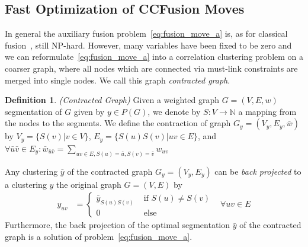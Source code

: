 \documentclass[10pt,twocolumn,letterpaper]{article}
\theoremstyle{definition}
\newtheorem{definition}{Definition}
\begin{document}
\subsection{Fast Optimization of CCFusion Moves} \label{sec:fast_optimization}
In general the auxiliary fusion problem~\ref{eq:fusion_move_a} is, as for classical fusion~\cite{Lempitsky-2010}, still NP-hard.
However, many variables have been fixed to be zero and we can reformulate~\ref{eq:fusion_move_a}
into a correlation clustering problem on a coarser graph, where all nodes which are connected
via must-link constraints are merged into single nodes. We call this graph \emph{contracted graph}.
%
\begin{definition}\emph{(Contracted Graph)}
Given a weighted graph $G=(V,E,w)$ segmentation of $G$ given by $y\in P(G)$,
we denote by $S: V \to \mathbb{N}$ a mapping from the nodes to the segments.
We define the contraction of graph $G_y=(V_y,E_y, \bar{w})$
by $V_y=\{S(v)|v\in V\}$, $E_y=\{S(u)S(v)|uv\in E\}$, and 
$\forall \bar{u}\bar{v}\in E_y: \bar{w}_{\bar{u}\bar{v}}=\sum_{uv\in E, S(u)=\bar{u},S(v)=\bar{v}}w_{uv}$ 
\end{definition}
%
Any clustering $\bar{y}$ of the contracted graph $G_y=(V_y,E_y)$ can be \emph{back projected} to a clustering $y$ the original graph $G=(V,E)$ by
%
\begin{align}
y_{uv}&=\left\{ 
\begin{array}{ll}
\bar{y}_{S(u)S(v)}& \textrm{ if }S(u) \neq S(v)\\
0                & \textrm{ else}
\end{array}
\right.& \forall uv \in E
\end{align}
Furthermore, the back projection of the optimal segmentation $\bar{y}$ of the contracted graph is a solution of problem~\ref{eq:fusion_move_a}.




\end{document}
